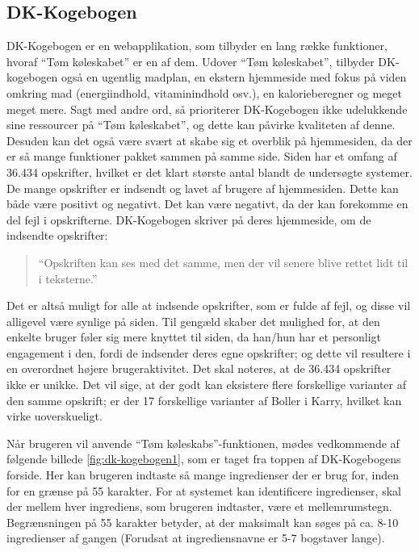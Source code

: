 \subsection{DK-Kogebogen}
\label{subsec:dk-kogebogen}

DK-Kogebogen er en webapplikation, som tilbyder en lang række funktioner, hvoraf ``Tøm køleskabet'' er en af dem. Udover ``Tøm køleskabet'', tilbyder DK-kogebogen også en ugentlig madplan, en ekstern hjemmeside med fokus på viden omkring mad (energiindhold, vitaminindhold osv.), en kalorieberegner og meget meget mere. Sagt med andre ord, så prioriterer DK-Kogebogen ikke udelukkende sine ressourcer på ``Tøm køleskabet'', og dette kan påvirke kvaliteten af denne. Desuden kan det også være svært at skabe sig et overblik på hjemmesiden, da der er så mange funktioner pakket sammen på samme side. Siden har et omfang af 36.434 opskrifter, hvilket er det klart største antal blandt de undersøgte systemer. De mange opskrifter er indsendt og lavet af brugere af hjemmesiden. Dette kan både være positivt og negativt. Det kan være negativt, da der kan forekomme en del fejl i opskrifterne. DK-Kogebogen skriver på deres hjemmeside, om de indsendte opskrifter:

\begin{quote}
``Opskriften kan ses med det samme, men der vil senere blive rettet lidt til i teksterne.'' \cite{dk-kog-indtastopskrift}
\end{quote}

Det er altså muligt for alle at indsende opskrifter, som er fulde af fejl, og disse vil alligevel være synlige på siden. Til gengæld skaber det mulighed for, at den enkelte bruger føler sig mere knyttet til siden, da han/hun har et personligt engagement i den, fordi de indsender deres egne opskrifter; og dette vil resultere i en overordnet højere brugeraktivitet. Det skal noteres, at de 36.434 opskrifter ikke er unikke. Det vil sige, at der godt kan eksistere flere forskellige varianter af den samme opskrift; \fx er der 17 forskellige varianter af Boller i Karry, hvilket kan virke uoverskueligt.

Når brugeren vil anvende ``Tøm køleskabs''-funktionen, mødes vedkommende af følgende billede \ref{fig:dk-kogebogen1}, som er taget fra toppen af DK-Kogebogens forside. Her kan brugeren indtaste så mange ingredienser der er brug for, inden for en grænse på 55 karakter. For at systemet kan identificere ingredienser, skal der mellem hver ingrediens, som brugeren indtaster, være et mellemrumstegn. Begrænsningen på 55 karakter betyder, at der maksimalt kan søges på ca. 8-10 ingredienser af gangen (Forudsat at ingrediensnavne er 5-7 bogstaver lange).

